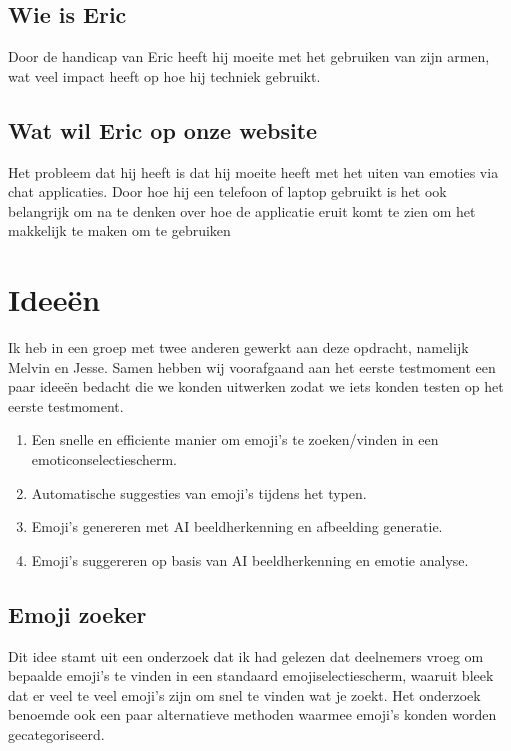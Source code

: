 \documentclass[12pt]{article}
\begin{document}
\subsection{Wie is Eric}

Door de handicap van Eric heeft hij moeite met het gebruiken van zijn armen, wat veel impact heeft op hoe hij techniek gebruikt.

\subsection{Wat wil Eric op onze website}


Het probleem dat hij heeft is dat hij moeite heeft met het uiten van emoties via chat applicaties.
Door hoe hij een telefoon of laptop gebruikt is het ook belangrijk om na te denken over hoe de applicatie eruit komt te zien om het makkelijk te maken om te gebruiken

\clearpage\section{Ideeën}
Ik heb in een groep met twee anderen gewerkt aan deze opdracht, namelijk Melvin en Jesse.
Samen hebben wij voorafgaand aan het eerste testmoment een paar ideeën bedacht die we konden uitwerken zodat we iets konden testen op het eerste testmoment.

\begin{enumerate}
	\item Een snelle en efficiente manier om emoji's te zoeken/vinden in een emoticonselectiescherm.
	\item Automatische suggesties van emoji's tijdens het typen.
	\item Emoji's genereren met AI beeldherkenning en afbeelding generatie.
	\item Emoji's suggereren op basis van AI beeldherkenning en emotie analyse.
\end{enumerate}

\subsection{Emoji zoeker}

Dit idee stamt uit een onderzoek dat ik had gelezen dat deelnemers vroeg om bepaalde emoji's te vinden in een standaard emojiselectiescherm, waaruit bleek dat er veel te veel emoji's zijn om snel te vinden wat je zoekt.
Het onderzoek benoemde ook een paar alternatieve methoden waarmee emoji's konden worden gecategoriseerd.
\end{document}
